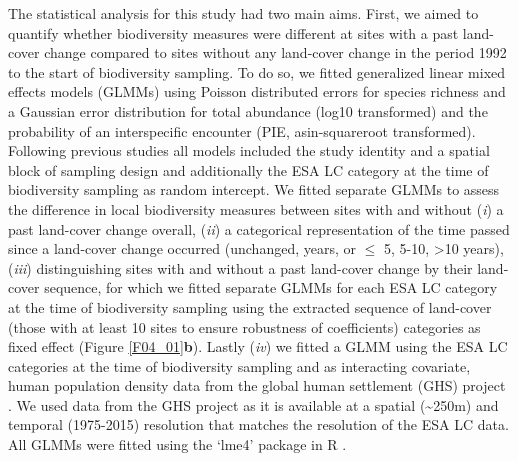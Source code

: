 The statistical analysis for this study had two main aims. First, we aimed to quantify whether biodiversity measures were different at sites with a past land-cover change compared to sites without any land-cover change in the period 1992 to the start of biodiversity sampling. To do so, we fitted generalized linear mixed effects models (GLMMs) using Poisson distributed errors for species richness and a Gaussian error distribution for total abundance (log10 transformed) and the probability of an interspecific encounter (PIE, asin-squareroot transformed). Following previous studies \citep{Newbold2016,Jung2016} all models included the study identity and a spatial block of sampling design and additionally the ESA LC category at the time of biodiversity sampling as random intercept. We fitted separate GLMMs to assess the difference in local biodiversity measures between sites with and without (\textit{i}) a past land-cover change overall, (\textit{ii}) a categorical representation of the time passed since a land-cover change occurred (unchanged,  years, or $\leq$ 5, 5-10, >10 years), (\textit{iii}) distinguishing sites with and without a past land-cover change by their land-cover sequence, for which we fitted separate GLMMs for each ESA LC category at the time of biodiversity sampling using the extracted sequence of land-cover (those with at least 10 sites to ensure robustness of coefficients) categories as fixed effect (Figure \ref{F04_01}\textbf{b}). Lastly (\textit{iv}) we fitted a GLMM using the ESA LC categories at the time of biodiversity sampling and as interacting covariate, human population density data from the global human settlement (GHS) project \citep{Pesaresi2013,Pesaresi2016}. We used data from the GHS project as it is available at a spatial (\textasciitilde 250m) and temporal (1975-2015) resolution that matches the resolution of the ESA LC data. All GLMMs were fitted using the ‘lme4’ package \citep[ver. 1.1-18-1,][]{lme4} in R \citep[ver. 3.5, ][]{RTeam2014}.

